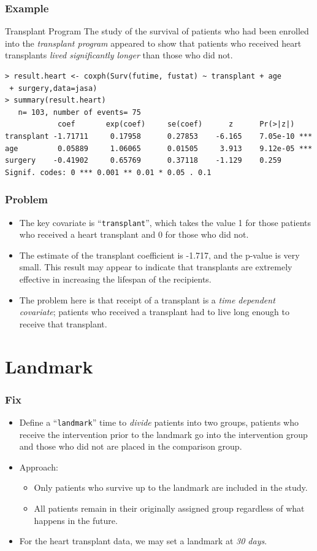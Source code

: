 \documentclass{beamer}
\newcommand{\empr}[1]{{\emph{\color{red}#1}}}
\begin{document}
\pagebreak
\begin{frame}[fragile]
\frametitle{Example}
\begin{problock}{Transplant Program}
The study of the survival of patients who had been enrolled into the \empr{transplant program} appeared to show that patients who received heart transplants \empr{lived significantly longer} than those who did not.
\end{problock}
\begin{Verbatim}
> result.heart <- coxph(Surv(futime, fustat) ~ transplant + age
 + surgery,data=jasa)
> summary(result.heart)
   n= 103, number of events= 75
            coef       exp(coef)     se(coef)      z      Pr(>|z|)
transplant -1.71711     0.17958      0.27853    -6.165    7.05e-10 ***
age         0.05889     1.06065      0.01505     3.913    9.12e-05 ***    
surgery    -0.41902     0.65769      0.37118    -1.129    0.259 
Signif. codes: 0 *** 0.001 ** 0.01 * 0.05 . 0.1 
\end{Verbatim}
\end{frame}

\pagebreak
\begin{frame}
\frametitle{Problem}
\begin{itemize}
\item The key covariate is ``\texttt{transplant}'', which takes the value 1 for those patients who received a heart transplant and 0 for those who did not.
\item The estimate of the transplant coefficient is -1.717, and the p-value is very small. This result may appear to indicate that transplants are extremely effective in increasing the lifespan of the recipients.
\item The problem here is that receipt of a transplant is a \empr{time dependent covariate}; patients who received a transplant had to live long enough to receive that transplant.
\end{itemize}
\end{frame}

\section{Landmark}
\begin{frame}[fragile]
\frametitle{Fix}
\begin{itemize}
\item Define a ``\texttt{landmark}'' time to \empr{divide} patients into two groups, patients who receive the intervention prior to the landmark go into the intervention group and those who did not are placed in the comparison group.
\item Approach:
\begin{itemize}
\item Only patients who survive up to the landmark are included in the study.
\item All patients remain in their originally assigned group regardless of what happens in the future.
\end{itemize}
\item For the heart transplant data, we may set a landmark at \empr{30 days}.
\end{itemize}
\end{frame}
\end{document}
